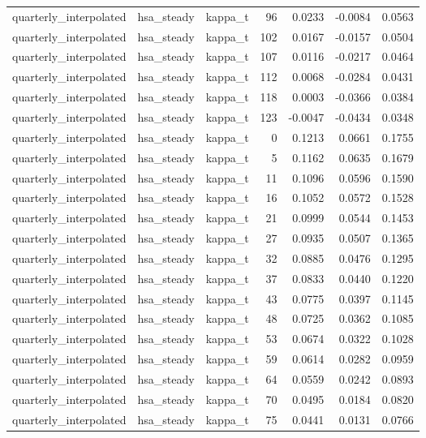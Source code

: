 \begin{tabular}{lllrrrr}
quarterly\_interpolated & hsa\_steady & kappa\_t & 96 & 0.0233 & -0.0084 & 0.0563 \\
quarterly\_interpolated & hsa\_steady & kappa\_t & 102 & 0.0167 & -0.0157 & 0.0504 \\
quarterly\_interpolated & hsa\_steady & kappa\_t & 107 & 0.0116 & -0.0217 & 0.0464 \\
quarterly\_interpolated & hsa\_steady & kappa\_t & 112 & 0.0068 & -0.0284 & 0.0431 \\
quarterly\_interpolated & hsa\_steady & kappa\_t & 118 & 0.0003 & -0.0366 & 0.0384 \\
quarterly\_interpolated & hsa\_steady & kappa\_t & 123 & -0.0047 & -0.0434 & 0.0348 \\
quarterly\_interpolated & hsa\_steady & kappa\_t & 0 & 0.1213 & 0.0661 & 0.1755 \\
quarterly\_interpolated & hsa\_steady & kappa\_t & 5 & 0.1162 & 0.0635 & 0.1679 \\
quarterly\_interpolated & hsa\_steady & kappa\_t & 11 & 0.1096 & 0.0596 & 0.1590 \\
quarterly\_interpolated & hsa\_steady & kappa\_t & 16 & 0.1052 & 0.0572 & 0.1528 \\
quarterly\_interpolated & hsa\_steady & kappa\_t & 21 & 0.0999 & 0.0544 & 0.1453 \\
quarterly\_interpolated & hsa\_steady & kappa\_t & 27 & 0.0935 & 0.0507 & 0.1365 \\
quarterly\_interpolated & hsa\_steady & kappa\_t & 32 & 0.0885 & 0.0476 & 0.1295 \\
quarterly\_interpolated & hsa\_steady & kappa\_t & 37 & 0.0833 & 0.0440 & 0.1220 \\
quarterly\_interpolated & hsa\_steady & kappa\_t & 43 & 0.0775 & 0.0397 & 0.1145 \\
quarterly\_interpolated & hsa\_steady & kappa\_t & 48 & 0.0725 & 0.0362 & 0.1085 \\
quarterly\_interpolated & hsa\_steady & kappa\_t & 53 & 0.0674 & 0.0322 & 0.1028 \\
quarterly\_interpolated & hsa\_steady & kappa\_t & 59 & 0.0614 & 0.0282 & 0.0959 \\
quarterly\_interpolated & hsa\_steady & kappa\_t & 64 & 0.0559 & 0.0242 & 0.0893 \\
quarterly\_interpolated & hsa\_steady & kappa\_t & 70 & 0.0495 & 0.0184 & 0.0820 \\
quarterly\_interpolated & hsa\_steady & kappa\_t & 75 & 0.0441 & 0.0131 & 0.0766 \\

\end{tabular}
